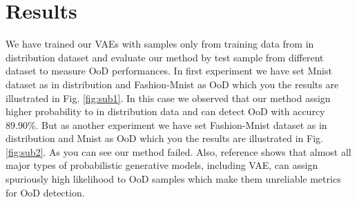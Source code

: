 \documentclass[12pt]{article}
\begin{document}
\section{Results}
We have trained our VAEs with samples only from training data from in distribution dataset and evaluate our method by test sample from different dataset to measure OoD performances. In first experiment we have set Mnist dataset as in distribution and Fashion-Mnist as OoD which you the results are illustrated in Fig. \ref{fig:sub1}. In this case we observed that our method assign higher probability to in distribution data and can detect OoD with accurcy 89.90\%. But as another experiment we have set Fashion-Mnist dataset as in distribution and Mnist as OoD which you the results are illustrated in Fig. \ref{fig:sub2}. As you can see our method failed. Also, reference \cite{nalisnick2018deep} shows that almost all major types of probabilistic generative models, including VAE, can assign spuriously high likelihood to OoD samples which make them unreliable metrics for OoD detection.  
\end{document}
